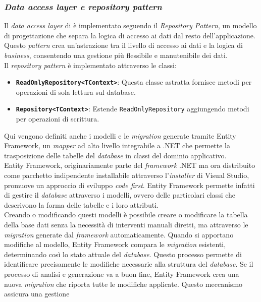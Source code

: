 \subsubsection{\textit{Data access layer e repository pattern}}
Il \textit{data access layer} di {\movi} è implementato seguendo il \textit{Repository Pattern}, un modello di progettazione 
che separa la logica di accesso ai dati dal resto dell'applicazione. Questo \textit{pattern} crea un'astrazione tra il livello 
di accesso ai dati e la logica di \textit{business}, consentendo una gestione più flessibile e manutenibile dei dati.\\
Il \textit{repository pattern} è implementato attraverso le classi:
\begin{itemize}
\item \texttt{\textbf{ReadOnlyRepository<TContext>}}: Questa classe astratta fornisce metodi per operazioni di sola lettura sul database.
\item \texttt{\textbf{Repository<TContext>}}: Estende \texttt{ReadOnlyRepository} aggiungendo metodi per operazioni di scrittura.
\end{itemize}
Qui vengono definiti anche i modelli e le \textit{migration} generate tramite Entity Framework, un 
\textit{mapper} ad alto livello integrabile a .NET che permette la trasposizione delle tabelle del \textit{database} in 
classi del dominio applicativo.\\
Entity Framework, originariamente parte del \textit{framework} .NET ma ora distribuito come pacchetto indipendente 
installabile attraverso l'\textit{installer} di Visual Studio, promuove un approccio di sviluppo \textit{code first}. 
Entity Framework permette infatti di gestire il \textit{database} attraverso i modelli, ovvero delle particolari classi 
che descrivono la forma delle tabelle e i loro attributi.\\
Creando o modificando questi modelli è possibile creare o modificare la tabella della base dati senza la necessità di 
interventi manuali diretti, ma attraverso le \textit{migration} generate dal \textit{framework} automaticamente. 
Quando si apportano modifiche al modello, Entity Framework compara le \textit{migration} esistenti, determinando così 
lo stato attuale del \textit{database}. Questo processo permette di identificare precisamente le modifiche necessarie 
alla struttura del \textit{database}. Se il processo di analisi e generazione va a buon fine, Entity Framework crea 
una nuova \textit{migration} che riporta tutte le modifiche applicate. Questo meccanismo assicura una gestione 
